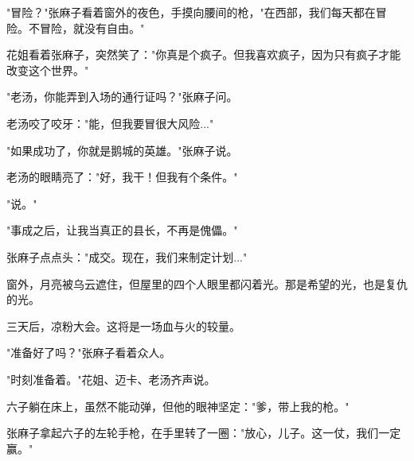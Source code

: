 "冒险？"张麻子看着窗外的夜色，手摸向腰间的枪，"在西部，我们每天都在冒险。不冒险，就没有自由。"

花姐看着张麻子，突然笑了："你真是个疯子。但我喜欢疯子，因为只有疯子才能改变这个世界。"

"老汤，你能弄到入场的通行证吗？"张麻子问。

老汤咬了咬牙："能，但我要冒很大风险..."

"如果成功了，你就是鹅城的英雄。"张麻子说。

老汤的眼睛亮了："好，我干！但我有个条件。"

"说。"

"事成之后，让我当真正的县长，不再是傀儡。"

张麻子点点头："成交。现在，我们来制定计划..."

窗外，月亮被乌云遮住，但屋里的四个人眼里都闪着光。那是希望的光，也是复仇的光。

三天后，凉粉大会。这将是一场血与火的较量。

"准备好了吗？"张麻子看着众人。

"时刻准备着。"花姐、迈卡、老汤齐声说。

六子躺在床上，虽然不能动弹，但他的眼神坚定："爹，带上我的枪。"

张麻子拿起六子的左轮手枪，在手里转了一圈："放心，儿子。这一仗，我们一定赢。"